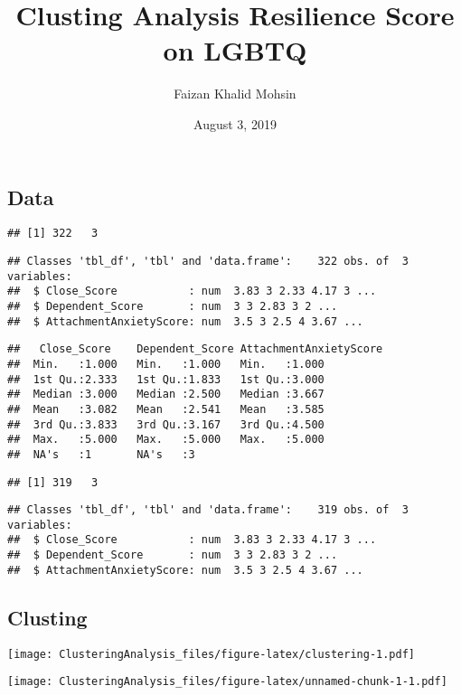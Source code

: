 \documentclass[]{article}
\title{Clusting Analysis Resilience Score on LGBTQ}
\author{Faizan Khalid Mohsin}
\date{August 3, 2019}
\begin{document}
\maketitle

\newpage

\subsection{Data}\label{data}

\begin{verbatim}
## [1] 322   3
\end{verbatim}

\begin{verbatim}
## Classes 'tbl_df', 'tbl' and 'data.frame':    322 obs. of  3 variables:
##  $ Close_Score           : num  3.83 3 2.33 4.17 3 ...
##  $ Dependent_Score       : num  3 3 2.83 3 2 ...
##  $ AttachmentAnxietyScore: num  3.5 3 2.5 4 3.67 ...
\end{verbatim}

\begin{verbatim}
##   Close_Score    Dependent_Score AttachmentAnxietyScore
##  Min.   :1.000   Min.   :1.000   Min.   :1.000         
##  1st Qu.:2.333   1st Qu.:1.833   1st Qu.:3.000         
##  Median :3.000   Median :2.500   Median :3.667         
##  Mean   :3.082   Mean   :2.541   Mean   :3.585         
##  3rd Qu.:3.833   3rd Qu.:3.167   3rd Qu.:4.500         
##  Max.   :5.000   Max.   :5.000   Max.   :5.000         
##  NA's   :1       NA's   :3
\end{verbatim}

\begin{verbatim}
## [1] 319   3
\end{verbatim}

\begin{verbatim}
## Classes 'tbl_df', 'tbl' and 'data.frame':    319 obs. of  3 variables:
##  $ Close_Score           : num  3.83 3 2.33 4.17 3 ...
##  $ Dependent_Score       : num  3 3 2.83 3 2 ...
##  $ AttachmentAnxietyScore: num  3.5 3 2.5 4 3.67 ...
\end{verbatim}

\subsection{Clusting}\label{clusting}

\texttt{[image: ClusteringAnalysis\_files/figure-latex/clustering-1.pdf]}

\texttt{[image: ClusteringAnalysis\_files/figure-latex/unnamed-chunk-1-1.pdf]}
\end{document}
